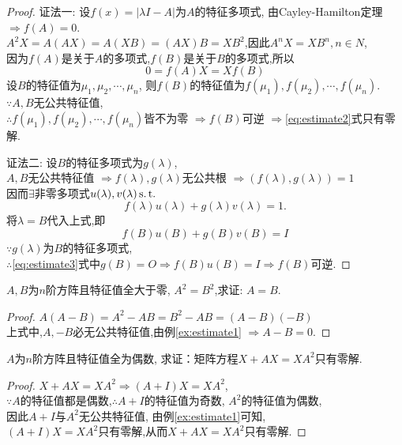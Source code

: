 \begin{proof}

  {\heiti 证法一:}
  设$f(x)=|\lambda I-A|$为$A$的特征多项式,
  由Cayley-Hamilton定理$\Longrightarrow f(A)=0$.\\
  $A^2X=A(AX)=A(XB)=(AX)B=XB^2$,因此$A^nX=XB^n, n \in N$,\\
  因为$f(A)$是关于$A$的多项式,$f(B)$是关于$B$的多项式,所以
  \begin{equation}\label{eq:estimate2}
    0=f(A)X = Xf(B)
  \end{equation}
  设$B$的特征值为$\mu_1,\mu_2,\cdots,\mu_n$,
  则$f(B)$的特征值为$f(\mu_1),f(\mu_2),\cdots,f(\mu_n)$.\\
  $\because A,B$无公共特征值, \\
  $\therefore f(\mu_1),f(\mu_2),\cdots,f(\mu_n)$皆不为零
  $\Longrightarrow f(B)$可逆
  $\Longrightarrow$\eqref{eq:estimate2}式只有零解.

  {\heiti 证法二:}
  设$B$的特征多项式为$g(\lambda)$,\\
  $A,B$无公共特征值 $\Longrightarrow f(\lambda), g(\lambda)$无公共根
  $\Longrightarrow (f(\lambda),g(\lambda))=1$\\
  因而$\exists$非零多项式$u(\lambda),v(\lambda) \operatorname{s.t.{}}$
  \begin{equation*}
    f(\lambda)u(\lambda)+g(\lambda)v(\lambda)=1.
  \end{equation*}
  将$\lambda=B$代入上式,即
  \begin{equation}\label{eq:estimate3}
    f(B)u(B)+g(B)v(B)=I
  \end{equation}
  $\because g(\lambda)$为$B$的特征多项式,\\
  $\therefore$\eqref{eq:estimate3}式中$g(B)=O \Longrightarrow f(B)u(B)=I
  \Longrightarrow f(B)$可逆.
\end{proof}
\begin{application}
  $A,B$为$n$阶方阵且特征值全大于零, $A^2=B^2$,求证: $A=B$.
\end{application}
\begin{proof}
  $A(A-B)=A^2-AB=B^2-AB=(A-B)(-B)$\\
  上式中,$A,-B$必无公共特征值,由例\ref{ex:estimate1}
  $\Longrightarrow A-B = 0$.
\end{proof}
\begin{application}
  $A$为$n$阶方阵且特征值全为偶数,
  求证：矩阵方程$X+AX=XA^2$只有零解.
\end{application}
\begin{proof}
  $X+AX=XA^2 \Longrightarrow (A+I)X=XA^2$, \\
  $\because A$的特征值都是偶数,$\therefore A+I$的特征值为奇数, $A^2$的特征值为偶数,\\
  因此$A+I$与$A^2$无公共特征值,
  由例\ref{ex:estimate1}可知, \\
  $(A+I)X=XA^2$只有零解,从而$X+AX=XA^2$只有零解.
\end{proof}
